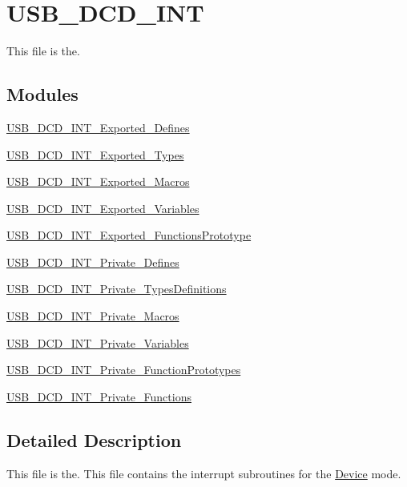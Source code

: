 \hypertarget{group___u_s_b___d_c_d___i_n_t}{\section{U\-S\-B\-\_\-\-D\-C\-D\-\_\-\-I\-N\-T}
\label{group___u_s_b___d_c_d___i_n_t}
}


This file is the.  


\subsection*{Modules}
\begin{DoxyCompactItemize}
\item 
\hyperlink{group___u_s_b___d_c_d___i_n_t___exported___defines}{U\-S\-B\-\_\-\-D\-C\-D\-\_\-\-I\-N\-T\-\_\-\-Exported\-\_\-\-Defines}
\item 
\hyperlink{group___u_s_b___d_c_d___i_n_t___exported___types}{U\-S\-B\-\_\-\-D\-C\-D\-\_\-\-I\-N\-T\-\_\-\-Exported\-\_\-\-Types}
\item 
\hyperlink{group___u_s_b___d_c_d___i_n_t___exported___macros}{U\-S\-B\-\_\-\-D\-C\-D\-\_\-\-I\-N\-T\-\_\-\-Exported\-\_\-\-Macros}
\item 
\hyperlink{group___u_s_b___d_c_d___i_n_t___exported___variables}{U\-S\-B\-\_\-\-D\-C\-D\-\_\-\-I\-N\-T\-\_\-\-Exported\-\_\-\-Variables}
\item 
\hyperlink{group___u_s_b___d_c_d___i_n_t___exported___functions_prototype}{U\-S\-B\-\_\-\-D\-C\-D\-\_\-\-I\-N\-T\-\_\-\-Exported\-\_\-\-Functions\-Prototype}
\item 
\hyperlink{group___u_s_b___d_c_d___i_n_t___private___defines}{U\-S\-B\-\_\-\-D\-C\-D\-\_\-\-I\-N\-T\-\_\-\-Private\-\_\-\-Defines}
\item 
\hyperlink{group___u_s_b___d_c_d___i_n_t___private___types_definitions}{U\-S\-B\-\_\-\-D\-C\-D\-\_\-\-I\-N\-T\-\_\-\-Private\-\_\-\-Types\-Definitions}
\item 
\hyperlink{group___u_s_b___d_c_d___i_n_t___private___macros}{U\-S\-B\-\_\-\-D\-C\-D\-\_\-\-I\-N\-T\-\_\-\-Private\-\_\-\-Macros}
\item 
\hyperlink{group___u_s_b___d_c_d___i_n_t___private___variables}{U\-S\-B\-\_\-\-D\-C\-D\-\_\-\-I\-N\-T\-\_\-\-Private\-\_\-\-Variables}
\item 
\hyperlink{group___u_s_b___d_c_d___i_n_t___private___function_prototypes}{U\-S\-B\-\_\-\-D\-C\-D\-\_\-\-I\-N\-T\-\_\-\-Private\-\_\-\-Function\-Prototypes}
\item 
\hyperlink{group___u_s_b___d_c_d___i_n_t___private___functions}{U\-S\-B\-\_\-\-D\-C\-D\-\_\-\-I\-N\-T\-\_\-\-Private\-\_\-\-Functions}
\end{DoxyCompactItemize}


\subsection{Detailed Description}
This file is the. This file contains the interrupt subroutines for the \hyperlink{struct_device}{Device} mode.